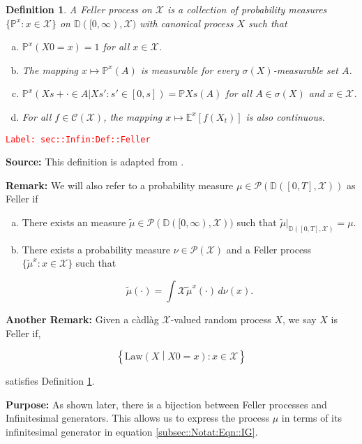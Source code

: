 \documentclass[12pt]{article}
\newcommand{\mb}{\mathbb}
\newcommand{\mc}{\mathcal}
\newcommand{\te}{\text}
\newcommand{\tr}{\textcolor{red}}
\newcommand{\labe}[1]{\tr{\texttt{Label: #1}}}
\newcommand{\purpose}{\textbf{Purpose: }}
\newcommand{\pr}{\mb{P}}							%
\newcommand{\exmu}[2]{\mb{E}^{#1}\left[#2\right]}	%
\newcommand{\cad}{\mb{D}}							%
\newcommand{\T}{T}								%
\newcommand{\x}{x}								%
\renewcommand{\t}{t}							%
\renewcommand{\tt}{s}							%
\newcommand{\ttt}{s'}							%
\newcommand{\X}{X}								%
\newcommand{\f}{f}								%
\newcommand{\cont}{\mc{C}}						%
\newcommand{\alt}[1]{\widetilde{#1}}			%
\newcommand{\m}{\mu}							%
\newcommand{\mm}{\nu}							%
\newcommand{\law}{\te{Law}}						%
\newcommand{\typset}{A}							%
\newcommand{\spce}{\mc{X}}						%
\newtheorem{defn}[thms]{Definition}
\begin{document}
\begin{defn}
A Feller process on \(\spce\) is a collection of probability measures \(\{\pr^\x:\x \in \spce\}\) on \(\cad([0,\infty),\spce)\) with canonical process \(\X\) such that

\begin{enumerate}[(a)]
\item \(\pr^\x(\X{}{0} = \x) = 1\) for all \(\x \in \spce\).

\item The mapping \(\x \mapsto \pr^\x(\typset)\) is measurable for every \(\sigma(\X)\)-measurable set \(\typset\).

\item \(\pr^\x(\X{}{\tt+\cdot} \in \typset|\X{}{\ttt}:\ttt \in [0,\tt]) = \pr{\X{}{\tt}}(\typset)\) for all \(\typset \in \sigma(\X)\) and \(\x \in \spce\).

\item For all \(\f\in \cont(\spce)\), the mapping \(\x\mapsto \exmu{\x}{\f(\X_{\t})}\) is also continuous.
\end{enumerate}
\label{sec::Infin:Def::Feller}
\end{defn}
\labe{sec::Infin:Def::Feller}

\textbf{Source: } This definition is adapted from \cite[Definition 1.1,1.2]{Lig85}.

\textbf{Remark: } We will also refer to a probability measure \(\m \in \mc{P}(\cad([0,\T],\spce))\) as Feller if

\begin{enumerate}[(a)]
\item There exists an measure \(\alt{\m}\in \mc{P}(\cad([0,\infty),\spce))\) such that \(\alt{\m}|_{\cad([0,T],\spce)} = \m\).

\item There exists a probability measure \(\mm\in \mc{P}(\spce)\) and a Feller process \(\{\alt{\m}^\x:\x \in \spce\}\) such that 

\[\alt{\m}(\cdot) = \int{\spce} \alt{\m}^\x(\cdot)\,d\mm(\x).\]
\end{enumerate}

\textbf{Another Remark: } Given a c\`adl\`ag \(\spce\)-valued random process \(\X{}{}\), we say \(\X{}{}\) is Feller if,

\[\left\{\law\left(\X{}{}\middle|\X{}{0} = \x{}{}\right): \x{}{} \in \spce\right\}\]

satisfies Definition \ref{sec::Infin:Def::Feller}.

\purpose As shown later, there is a bijection between Feller processes and Infinitesimal generators. This allows us to express the process \(\mu\) in terms of its infinitesimal generator in equation \eqref{subsec::Notat:Eqn::IG}.
\end{document}
